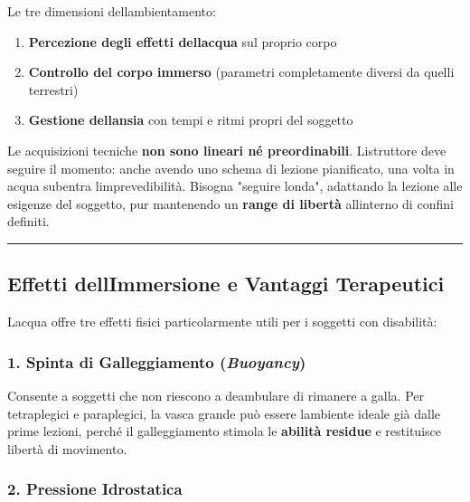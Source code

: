 \documentclass[a4paper,11pt]{article}
\providecommand{\tightlist}{%
  \setlength{\itemsep}{0pt}\setlength{\parskip}{0pt}}
\begin{document}
Le tre dimensioni dell\textquotesingle ambientamento:

\begin{enumerate}
      \tightlist
      \item
            \textbf{Percezione degli effetti dell\textquotesingle acqua} sul
            proprio corpo
      \item
            \textbf{Controllo del corpo immerso} (parametri completamente diversi
            da quelli terrestri)
      \item
            \textbf{Gestione dell\textquotesingle ansia} con tempi e ritmi propri
            del soggetto
\end{enumerate}

Le acquisizioni tecniche \textbf{non sono lineari né preordinabili}.
L\textquotesingle istruttore deve seguire il momento: anche avendo uno
schema di lezione pianificato, una volta in acqua subentra
l\textquotesingle imprevedibilità. Bisogna "seguire
l\textquotesingle onda", adattando la lezione alle esigenze del
soggetto, pur mantenendo un \textbf{range di libertà}
all\textquotesingle interno di confini definiti.

\begin{center}\rule{0.5\linewidth}{0.5pt}\end{center}

\subsection{Effetti dell\textquotesingle Immersione e Vantaggi
      Terapeutici}\label{effetti-dellimmersione-e-vantaggi-terapeutici}

L\textquotesingle acqua offre tre effetti fisici particolarmente utili
per i soggetti con disabilità:

\subsubsection{\texorpdfstring{1. Spinta di Galleggiamento
            (\emph{Buoyancy})}{1. Spinta di Galleggiamento (Buoyancy)}}\label{spinta-di-galleggiamento-buoyancy}

Consente a soggetti che non riescono a deambulare di rimanere a galla.
Per tetraplegici e paraplegici, la vasca grande può essere
l\textquotesingle ambiente ideale già dalle prime lezioni, perché il
galleggiamento stimola le \textbf{abilità residue} e restituisce libertà
di movimento.

\subsubsection{2. Pressione Idrostatica}\label{pressione-idrostatica}
\end{document}
